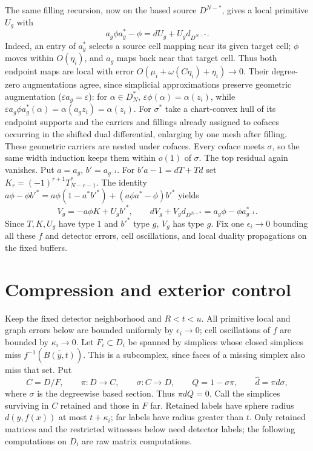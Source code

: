 \documentclass[11pt]{amsart}
\numberwithin{equation}{section}
\theoremstyle{definition}
\theoremstyle{remark}
\begin{document}
The same filling recursion, now on the based source $D^{N-*}$, gives
a local primitive $U_g$ with
\begin{equation}\label{geo:isometry-homotopy}
 a_g\phi a_g^*-\phi=dU_g+U_gd_{D^{N-*}}.
\end{equation}
Indeed, an entry of $a_g^*$ selects a source cell mapping near its
given target cell; $\phi$ moves within $O(\eta_i)$, and $a_g$ maps back
near that target cell. Thus both endpoint maps are local with error
$O(\mu_i+\omega(C\eta_i)+\eta_i)\to0$. Their degree-zero
augmentations agree, since simplicial approximations preserve
geometric augmentation ($\varepsilon a_g=\varepsilon$): for
$\alpha\in D_N^*$,
$\varepsilon\phi(\alpha)=\alpha(z_i)$, while
$\varepsilon a_g\phi a_g^*(\alpha)=\alpha(a_gz_i)=\alpha(z_i)$.
For $\sigma^*$ take a chart-convex hull of its endpoint supports and
the carriers and fillings already assigned to cofaces occurring in
the shifted dual differential, enlarging by one mesh after filling.
These geometric carriers are nested under cofaces.
Every coface meets $\sigma$, so the same width induction keeps them
within $o(1)$ of $\sigma$. The top residual again vanishes.
Put $a=a_g$, $b'=a_{g^{-1}}$. For $b'a-1=dT+Td$ set
$K_r=(-1)^{r+1}T_{N-r-1}^*$. The identity
$a\phi-\phi b'^*=a\phi(1-a^*b'^*)+(a\phi a^*-\phi)b'^*$ yields
\begin{equation}\label{geo:adjoint-homotopy}
 V_g=-a\phi K+U_gb'^*,\qquad
 dV_g+V_gd_{D^{N-*}}=a_g\phi-\phi a_{g^{-1}}^*.
\end{equation}
Since $T,K,U_g$ have type $1$ and $b'^*$ type $g$, $V_g$ has type $g$.
Fix one $\epsilon_i\to0$ bounding all these $f$ and detector errors,
cell oscillations, and local duality propagations on the fixed buffers.

\section{Compression and exterior control}\label{geo:compression}

Keep the fixed detector neighborhood and $R<t<u$. All primitive local
and graph errors below are bounded uniformly by $\epsilon_i\to0$;
cell oscillations of $f$ are bounded by $\kappa_i\to0$.
Let $F_i\subset D_i$ be spanned by simplices whose closed simplices miss
$f^{-1}(\overline{B(y,t)})$. This is a subcomplex, since faces of a
missing simplex also miss that set. Put
\begin{equation}\label{geo:compression-data}
 C=D/F,\qquad \pi:D\to C,\qquad \sigma:C\to D,
 \qquad Q=1-\sigma\pi,\qquad \widehat d=\pi d\sigma,
\end{equation}
where $\sigma$ is the degreewise based section. Thus $\pi dQ=0$.
Call the simplices surviving in $C$ retained and those in $F$ far.
Retained labels have sphere radius $d(y,f(x))$ at most $t+\kappa_i$;
far labels have radius greater than $t$. Only retained matrices and the restricted
witnesses below need detector labels; the following computations on
$D_i$ are raw matrix computations.
\end{document}
